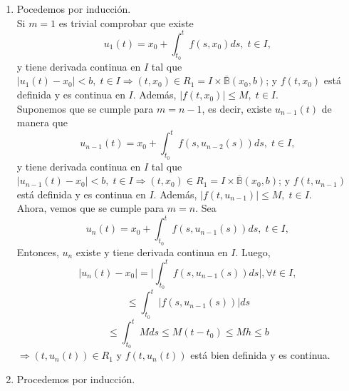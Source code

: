 \begin{dem}
  \begin{enumerate}[label=(\roman*)]
    \item Pocedemos por inducción. \\ 

      Si $m=1$ es trivial comprobar que existe
      \[
        u_{1}(t) = x_{0} + \int_{t_{0}}^{t} f(s, x_{0}) ds, \; t \in I,
      \]
      y tiene derivada continua en $I$ tal que $| u_{1}(t) - x_{0} | < b, \; t \in I \Rightarrow (t, x_{0}) \in R_{1} = I \times \overline{\mathbb{B}}(x_{0}, b)$; y $f(t, x_{0})$ está definida y es continua en $I$. Además, $| f(t, x_{0}) | \leq M, \; t \in I$. \\
      
      Suponemos que se cumple para $m=n-1$, es decir, existe $u_{n-1}(t)$ de manera que 
      \[
        u_{n-1}(t) = x_{0} + \int_{t_{0}}^{t} f(s, u_{n-2}(s)) ds, \; t \in I,
      \]
      y tiene derivada continua en $I$ tal que $| u_{n-1}(t) - x_{0} | < b, \; t \in I \Rightarrow (t, x_{0}) \in R_{1} = I \times \overline{\mathbb{B}}(x_{0}, b)$; y $f(t, u_{n-1})$ está definida y es continua en $I$. Además, $| f(t, u_{n-1}) | \leq M, \; t \in I$. \\

      Ahora, vemos que se cumple para $m=n$. Sea
      \[ 
        u_{n}(t) = x_{0} + \int_{t_{0}}^{t} f(s, u_{n-1}(s)) ds, \; t \in I,
      \] 
      Entonces, $u_{n}$ existe y tiene derivada continua en $I$. Luego,
      \[ 
        | u_{n}(t) - x_{0} | = \Big | \int_{t_{0}}^{t} f(s, u_{n-1}(s)) ds \Big |, \forall t \in I,
      \] 
      \[ 
        \leq \int_{t_{0}}^{t} | f(s, u_{n-1}(s)) | ds
      \] 
      \[ 
        \leq \int_{t_{0}}^{t} M ds \leq M(t - t_{0}) \leq Mh \leq b 
      \] 
      $\Rightarrow (t, u_{n}(t)) \in R_{1}$ y $f(t, u_{n}(t))$ está bien definida y es continua.
    \item Procedemos por inducción. \\


\end{enumerate}
\end{dem}
